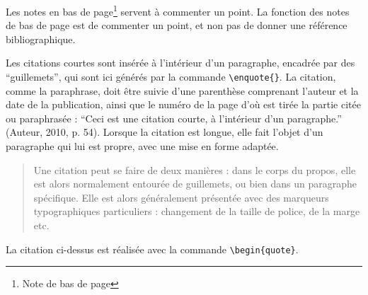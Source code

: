 Les notes en bas de page\footnote{Note de bas de page} servent à commenter un point. La fonction des notes de bas de page est de commenter un point, et non pas de donner une référence bibliographique.

Les citations courtes sont insérée à l'intérieur d'un paragraphe, encadrée par des \enquote{guillemets}, qui sont ici générés par la commande \verb?\enquote{}?. La citation, comme la paraphrase, doit être suivie d'une parenthèse comprenant l'auteur et la date de la publication, ainsi que le numéro de la page d'où est tirée la partie citée ou paraphrasée : \enquote{Ceci est une citation courte, à l'intérieur d'un paragraphe.} (Auteur, 2010, p. 54). Lorsque la citation est longue, elle fait l'objet d'un paragraphe qui lui est propre, avec une mise en forme adaptée.

\begin{quote}
	Une citation peut se faire de deux manières : dans le corps du propos, elle est alors normalement entourée de guillemets, ou bien dans un paragraphe spécifique. Elle est alors	généralement présentée avec des marqueurs typographiques particuliers : changement de la taille de police, de la marge etc.
\end{quote}

La citation ci-dessus est réalisée avec la commande \verb?\begin{quote}?.

